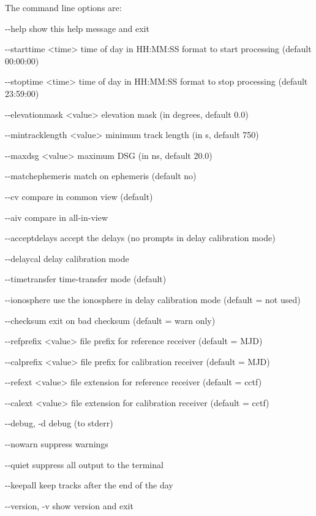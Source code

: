 The command line options are:
\begin{description*}
 \item[-{}-help]            show this help message and exit
 \item[-{}-starttime \textless{time}\textgreater ] time of day in HH:MM:SS format
  to start processing (default 00:00:00)
 \item[-{}-stoptime \textless{time}\textgreater]  time of day in HH:MM:SS format
  to stop processing (default 23:59:00)
 \item[-{}-elevationmask \textless{value}\textgreater] elevation mask (in degrees, default 0.0)
 \item[-{}-mintracklength \textless{value}\textgreater] minimum track length (in s, default 750)
 \item[-{}-maxdsg \textless{value}\textgreater]       maximum DSG (in ns, default 20.0)
 \item[-{}-matchephemeris ]     match on ephemeris (default no)
 \item[-{}-cv]                  compare in common view (default)
  \item[-{}-aiv]                 compare in all-in-view
  \item[-{}-acceptdelays]        accept the delays (no prompts in delay calibration mode)
  \item[-{}-delaycal]            delay calibration mode
  \item[-{}-timetransfer]        time-transfer mode (default)
  \item[-{}-ionosphere]          use the ionosphere in delay calibration mode (default = not used)
   \item[-{}-checksum]           exit on bad checksum (default = warn only)
  \item[-{}-refprefix \textless{value}\textgreater] file prefix for
		reference receiver (default = MJD)
  \item[-{}-calprefix \textless{value}\textgreater] file prefix for calibration
		receiver (default = MJD)
  \item[-{}-refext \textless{value}\textgreater]       file extension for reference receiver (default = cctf)
  \item[-{}-calext \textless{value}\textgreater]       file extension for calibration receiver (default = cctf)
  \item[-{}-debug, -d]           debug (to stderr)
  \item[-{}-nowarn]              suppress warnings
  \item[-{}-quiet]               suppress all output to the terminal
  \item[-{}-keepall]             keep tracks after the end of the day
  \item[-{}-version, -v]         show version and exit
\end{description*}

